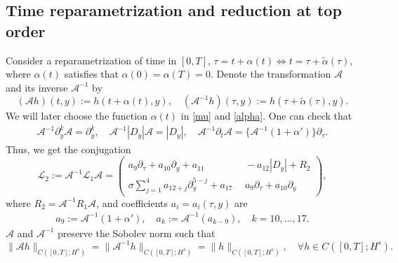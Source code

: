 \documentclass[12pt]{amsart}
\theoremstyle{remark}
\theoremstyle{definition}
\numberwithin{equation}{section}
\newcommand{\p}{\partial}
\newcommand{\al}{\alpha}
\newcommand{\mA}{\mathcal{A}}
\newcommand{\mL}{\mathcal{L}}
\newcommand{\inv}{^{-1}}
\begin{document}
\subsection{Time reparametrization and reduction at top order}
Consider a reparametrization of time in $[0,T]$,  $\tau = t + \al(t) \Leftrightarrow  t= \tau + \tilde{\al}(\tau)$, where $\al(t)$ satisfies that $\al(0)=\al(T)=0$.
Denote the transformation $\mA$ and its inverse $\mA^{-1}$ by
\begin{equation} \label{AAInverseDef}
    (\mathcal{A}h)(t,y) := h(t+\al(t), y), \quad (\mathcal{A}^{-1}h)(\tau,y) := h(\tau+ \tilde{\al}(\tau), y).
\end{equation}
We will later choose the function $\al(t)$ in \eqref{mu} and \eqref{alpha}.
One can check that
\begin{align*}
\mA\inv\p_y^k\mA=\p_y^k,\quad \mA\inv|D_y|\mA=|D_y|,\quad \mA\inv\p_t\mA=\{\mA\inv(1+\al')\}\p_{\tau}.
\end{align*}
Thus, we get the conjugation
\begin{equation} \label{LTwoMatrix}
\mL_2 :=\mA\inv\mL_1\mA=
 \begin{pmatrix}
 a_9\p_\tau+ a_{10} \p_y + a_{11}  \  & \ - a_{12}|D_y| + R_2 \\ 
\sigma \sum_{j= 1}^4 a_{12+j}\p_y^{5-j} + a_{17} \ & \  a_9\p_{\tau} + a_{10} \p_y
\end{pmatrix},
\end{equation}
where $R_2=\mathcal{A}^{-1}R_1\mA$, and  coefficients $a_i=a_i(\tau,y)$ are
\begin{align*}
a_9:=\mA\inv(1+\al'),\quad a_k:=\mA\inv(a_{k-9}),\quad k=10,...,17.
\end{align*}
$\mathcal{A}$ and $\mathcal{A}^{-1}$ preserve the Sobolev norm such that
\begin{equation} \label{AAInverseBound}
 \|\mathcal{A}h \|_{C([0,T]; H^s)} = \|\mathcal{A}^{-1}h \|_{C([0,T]; H^s)} = \|h \|_{C([0,T]; H^s)}, \quad \forall h \in C([0,T]; H^s).
\end{equation}
\end{document}
